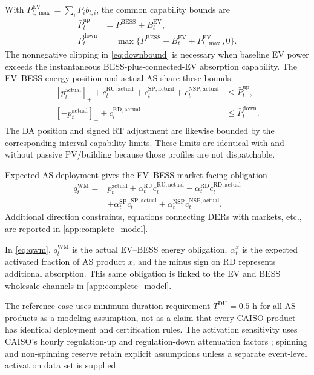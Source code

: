 \documentclass[final,5p,times]{elsarticle}
\newcommand{\EV}{\mathrm{EV}}
\newcommand{\BESS}{\mathrm{BESS}}
\newcommand{\RU}{\mathrm{RU}}
\newcommand{\RD}{\mathrm{RD}}
\newcommand{\SP}{\mathrm{SP}}
\newcommand{\NSP}{\mathrm{NSP}}
\newcommand{\WM}{\mathrm{WM}}
\newcommand{\actual}{\mathrm{actual}}
\newcommand{\pos}[1]{\left[#1\right]_{+}}
\begin{document}
With $P_{t,\max}^{\EV}=\sum_i\bar P_i b_{t,i}$, the common capability bounds are
\begin{align}
\bar P_t^{\mathrm{up}}&=P^{\BESS}+B_t^{\EV}, \label{eq:upbound}\\
\bar P_t^{\mathrm{down}}
&=\max\{P^{\BESS}-B_t^{\EV}+P_{t,\max}^{\EV},0\}. \label{eq:downbound}
\end{align}
The nonnegative clipping in \eqref{eq:downbound} is necessary when baseline EV
power exceeds the instantaneous BESS-plus-connected-EV absorption capability.
The EV--BESS energy position and actual AS share these bounds:
\begin{align}
\pos{p_t^{\actual}}+
c_t^{\RU,\actual}+c_t^{\SP,\actual}+c_t^{\NSP,\actual}
&\le\bar P_t^{\mathrm{up}}, \label{eq:up_envelope}\\
\pos{-p_t^{\actual}}+c_t^{\RD,\actual}
&\le\bar P_t^{\mathrm{down}}. \label{eq:down_envelope}
\end{align}
The DA position and signed RT adjustment are likewise bounded by the
corresponding interval capability limits. These limits are identical with and
without passive PV/building because those profiles are not dispatchable.

Expected AS deployment gives the EV--BESS market-facing obligation
\begin{align}
q_t^{\WM}={}&p_t^{\actual}
+\alpha_t^{\RU}c_t^{\RU,\actual}
-\alpha_t^{\RD}c_t^{\RD,\actual}\nonumber\\
&+\alpha_t^{\SP}c_t^{\SP,\actual}
+\alpha_t^{\NSP}c_t^{\NSP,\actual}. \label{eq:qwm}
\end{align}
Additional direction constraints, equations connecting DERs with markets, etc., are reported in \ref{app:complete_model}.

In \eqref{eq:qwm}, $q_t^{\WM}$ is the actual EV--BESS energy obligation,
$\alpha_t^x$ is the expected activated fraction of AS product $x$, and the
minus sign on RD represents additional absorption. This same obligation is
linked to the EV and BESS wholesale channels in \ref{app:complete_model}.

The reference case uses minimum duration requirement $T^{\mathrm{DU}}=0.5$ h for all AS products as a modeling
assumption, not as a claim that every CAISO product has identical deployment
and certification rules. The activation sensitivity uses CAISO's hourly
regulation-up and regulation-down attenuation factors
\cite{caisoAttenuation2025}; spinning and non-spinning reserve retain explicit
assumptions unless a separate event-level activation data set is supplied.
\end{document}
